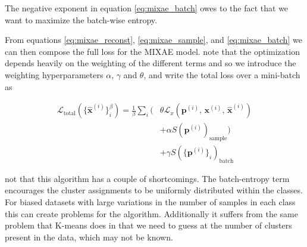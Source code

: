 \noindent The negative exponent in equation \ref{eq:mixae_batch} owes to the fact that we want to maximize the batch-wise entropy.

From equations \ref{eq:mixae_reconst}, \ref{eq:mixae_sample}, and \ref{eq:mixae_batch} we can then compose the full loss for the MIXAE model. \cite{Zhang} note that the optimization depends heavily on the weighting of the different terms and so we introduce the weighting hyperparameters $\alpha$, $\gamma$ and $\theta$, and write the total loss over a mini-batch as 

\begin{equation}
\begin{split}
\mathcal{L}_{\text{total}}(\{\hat{\mathbf{x}}^{(i)}\}^\beta_i) = \frac{1}{\beta}\sum_i \Big( &\theta \mathcal{L}_x(\mathbf{p}^{(i)},\,\mathbf{x}^{(i)},\, \hat{\mathbf{x}}^{(i)} ) \\
&+ \alpha S(\mathbf{p}^{(i)})_{\text{sample}} \Big) \\
&+\gamma S(\{\mathbf{p}^{(i)}\}_i)_{\text{batch}}
\end{split}
\end{equation}

\noindent \cite{Zhang} not that this algorithm has a couple of shortcomings. The batch-entropy term encourages the cluster assignments to be uniformly distributed within the classes. For biased datasets with large variations in the number of samples in each class this can create problems for the algorithm. Additionally it suffers from the same problem that K-means does in that we need to guess at the number of clusters present in the data, which may not be known.